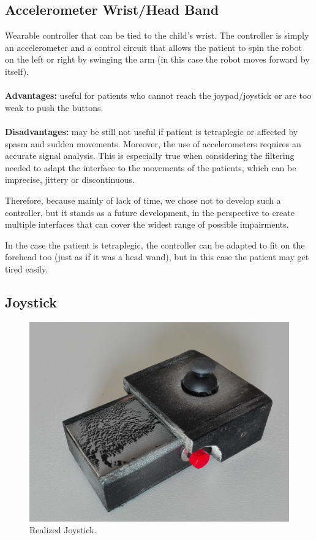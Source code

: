 \documentclass[a4paper,twoside]{book}
\begin{document}
\subsection{Accelerometer Wrist/Head Band}
\label{ssec:accel}
Wearable controller that can be tied to the child's wrist. The controller is simply an accelerometer and a control circuit that allows the patient to spin the robot on the left or right by swinging the arm (in this case the robot moves forward by itself).
\\
\\
\textbf{Advantages:} useful for patients who cannot reach the joypad/joystick or are too weak to push the buttons.
\\
\\
\textbf{Disadvantages:} may be still not useful if patient is tetraplegic or affected by spasm and sudden movements. Moreover, the use of accelerometers requires an accurate signal analysis. This is especially true when considering the filtering needed to adapt the interface to the movements of the patients, which can be imprecise, jittery or discontinuous. 

Therefore, because mainly of lack of time, we chose not to develop such a controller, but it stands as a future development, in the perspective to create multiple interfaces that can cover the widest range of possible impairments.

In the case the patient is tetraplegic, the controller can be adapted to fit on the forehead too (just as if it was a head wand), but in this case the patient may get tired easily.

\subsection{Joystick}

\begin{figure}[h]
\centering
\includegraphics[width=0.8\linewidth]{img/IMG_20160613_153916_1} 
\caption{Realized Joystick.}
\end{figure}
\end{document}
